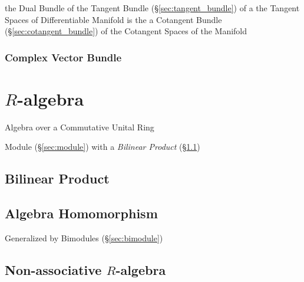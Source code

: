 the Dual Bundle of the Tangent Bundle (\S\ref{sec:tangent_bundle}) of a the
Tangent Spaces of Differentiable Manifold is the a Cotangent Bundle
(\S\ref{sec:cotangent_bundle}) of the Cotangent Spaces of the Manifold



\subsubsection{Complex Vector Bundle}\label{sec:complex_vector_bundle}



\section{$R$-algebra}\label{sec:r_algebra}

Algebra over a Commutative Unital Ring

Module (\S\ref{sec:module}) with a \emph{Bilinear Product}
(\S\ref{sec:bilinear_product})



\subsection{Bilinear Product}\label{sec:bilinear_product}

\subsection{Algebra Homomorphism}\label{sec:algebra_homomorphism}

Generalized by Bimodules (\S\ref{sec:bimodule})



\subsection{Non-associative $R$-algebra}
\label{sec:nonassociative_r_algebra}

